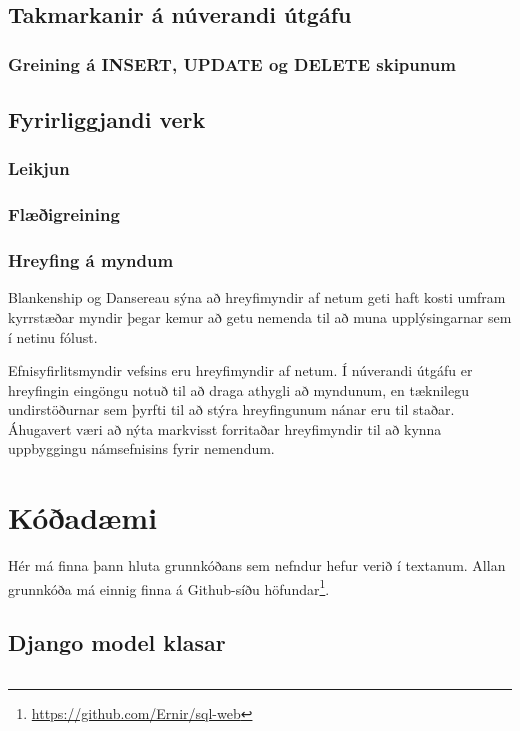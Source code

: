 \documentclass[a4paper,12pt,twoside,BCOR=10mm]{scrbook}
\begin{document}
\section{Takmarkanir á núverandi útgáfu}
\subsection{Greining á INSERT, UPDATE og DELETE skipunum}
\section{Fyrirliggjandi verk}
\subsection{Leikjun}
\subsection{Flæðigreining}
\subsection{Hreyfing á myndum}
Blankenship og Dansereau\cite{blankenship2000effect} sýna að hreyfimyndir af netum geti haft kosti umfram kyrrstæðar myndir þegar kemur að getu nemenda til að muna upplýsingarnar sem í netinu fólust.

Efnisyfirlitsmyndir vefsins eru hreyfimyndir af netum. Í núverandi útgáfu er hreyfingin eingöngu notuð til að draga athygli að myndunum, en tæknilegu undirstöðurnar sem þyrfti til að stýra hreyfingunum nánar eru til staðar. Áhugavert væri að nýta markvisst forritaðar hreyfimyndir til að kynna uppbyggingu námsefnisins fyrir nemendum.




\appendix
\renewcommand{\chaptername}{Appendix}
\chapter{Kóðadæmi}
Hér má finna þann hluta grunnkóðans sem nefndur hefur verið í textanum. Allan grunnkóða má einnig finna á Github-síðu höfundar\footnote{\url{https://github.com/Ernir/sql-web}}.
\section{Django model klasar}
\label{code:django-model-objects}
\inputminted[fontsize=\scriptsize, frame=lines, linenos=true, python3=true, label=models.py]{python}{../sql\string_web/models.py}
\end{document}
